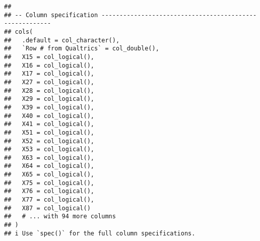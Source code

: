 \documentclass[
]{article}
\begin{document}
\begin{verbatim}
## 
## -- Column specification --------------------------------------------------------
## cols(
##   .default = col_character(),
##   `Row # from Qualtrics` = col_double(),
##   X15 = col_logical(),
##   X16 = col_logical(),
##   X17 = col_logical(),
##   X27 = col_logical(),
##   X28 = col_logical(),
##   X29 = col_logical(),
##   X39 = col_logical(),
##   X40 = col_logical(),
##   X41 = col_logical(),
##   X51 = col_logical(),
##   X52 = col_logical(),
##   X53 = col_logical(),
##   X63 = col_logical(),
##   X64 = col_logical(),
##   X65 = col_logical(),
##   X75 = col_logical(),
##   X76 = col_logical(),
##   X77 = col_logical(),
##   X87 = col_logical()
##   # ... with 94 more columns
## )
## i Use `spec()` for the full column specifications.
\end{verbatim}
\end{document}
